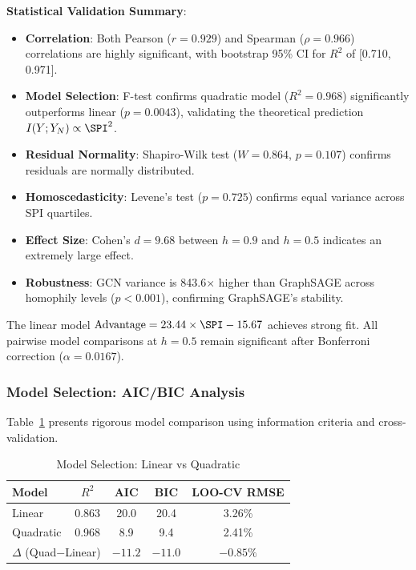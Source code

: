 \textbf{Statistical Validation Summary}:
\begin{itemize}
    \item \textbf{Correlation}: Both Pearson ($r = 0.929$) and Spearman ($\rho = 0.966$) correlations are highly significant, with bootstrap 95\% CI for $R^2$ of [0.710, 0.971].
    \item \textbf{Model Selection}: F-test confirms quadratic model ($R^2 = 0.968$) significantly outperforms linear ($p = 0.0043$), validating the theoretical prediction $I(Y; Y_N) \propto \SPI^2$.
    \item \textbf{Residual Normality}: Shapiro-Wilk test ($W = 0.864$, $p = 0.107$) confirms residuals are normally distributed.
    \item \textbf{Homoscedasticity}: Levene's test ($p = 0.725$) confirms equal variance across SPI quartiles.
    \item \textbf{Effect Size}: Cohen's $d = 9.68$ between $h=0.9$ and $h=0.5$ indicates an extremely large effect.
    \item \textbf{Robustness}: GCN variance is 843.6$\times$ higher than GraphSAGE across homophily levels ($p < 0.001$), confirming GraphSAGE's stability.
\end{itemize}

The linear model $\text{Advantage} = 23.44 \times \SPI - 15.67$ achieves strong fit. All pairwise model comparisons at $h=0.5$ remain significant after Bonferroni correction ($\alpha = 0.0167$).

\subsubsection{Model Selection: AIC/BIC Analysis}

Table~\ref{tab:model_selection} presents rigorous model comparison using information criteria and cross-validation.

\begin{table}[t]
\centering
\caption{Model Selection: Linear vs Quadratic}
\label{tab:model_selection}
\begin{tabular}{@{}lcccc@{}}
\toprule
Model & $R^2$ & AIC & BIC & LOO-CV RMSE \\
\midrule
Linear & 0.863 & 20.0 & 20.4 & 3.26\% \\
Quadratic & 0.968 & 8.9 & 9.4 & 2.41\% \\
\midrule
\multicolumn{2}{l}{$\Delta$ (Quad$-$Linear)} & $-11.2$ & $-11.0$ & $-0.85\%$ \\
\bottomrule
\end{tabular}
\end{table}


